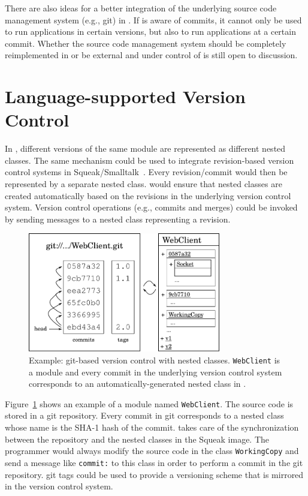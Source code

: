 There are also ideas for a better integration of the underlying source code management system (e.g., git) in \msname. If \msname is aware of commits, it cannot only be used to run applications in certain versions, but also to run applications at a certain commit. Whether the source code management system should be completely reimplemented in \msname or be external and under control of \msname is still open to discussion.

\section{Language-supported Version Control}
In \msname, different versions of the same module are represented as different nested classes. The same mechanism could be used to integrate revision-based version control systems in Squeak/Smalltalk~\cite{springerniephaus}. Every revision/commit would then be represented by a separate nested class. \msname would ensure that nested classes are created automatically based on the revisions in the underlying version control system. Version control operations (e.g., commits and merges) could be invoked by sending messages to a nested class representing a revision.

\begin{figure}[!htp]
	\includegraphics[width=0.75\textwidth]{matriona_concept.pdf}
	\centering
	\caption[Example: git-based version control with nested classes.]{Example: git-based version control with nested classes. \texttt{WebClient} is a module and every commit in the underlying version control system corresponds to an automatically-generated nested class in \msname.}
	\label{fig:fut_vers_control_git}
\end{figure}

Figure~\ref{fig:fut_vers_control_git} shows an example of a module named \texttt{WebClient}. The source code is stored in a git repository. Every commit in git corresponds to a nested class whose name is the SHA-1 hash of the commit. \msname takes care of the synchronization between the repository and the nested classes in the Squeak image. The programmer would always modify the source code in the class \texttt{WorkingCopy} and send a message like \texttt{commit:} to this class in order to perform a commit in the git repository. git tags could be used to provide a versioning scheme that is mirrored in the version control system.

